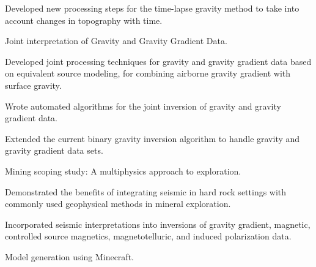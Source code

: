 \begin{cventries}
{\begin{cvitems}
        \item {Developed new processing steps for the time-lapse gravity method to take into account changes in topography with time.}
        \vspace{10pt}
      \end{cvitems}
      \begin{cvparagraph}
      \vspace{7pt}
      Joint interpretation of Gravity and Gravity Gradient Data.
      \vspace{7pt}
      \end{cvparagraph}
      \begin{cvitems}
        \item {Developed joint processing techniques for gravity and gravity gradient data based on equivalent source modeling, for combining airborne gravity gradient with surface gravity.}
        \item {Wrote automated algorithms for the joint inversion of gravity and gravity gradient data.}
        \item {Extended the current binary gravity inversion algorithm to handle gravity and gravity gradient data sets.}
        \vspace{10pt}
      \end{cvitems}
      \begin{cvparagraph}
      \vspace{7pt}
      Mining scoping study: A multiphysics approach to exploration.
      \vspace{7pt}
      \end{cvparagraph}
      \begin{cvitems}
        \item {Demonstrated the benefits of integrating seismic in hard rock settings with commonly used geophysical methods in mineral exploration.}
        \item {Incorporated seismic interpretations into inversions of gravity gradient, magnetic, controlled source magnetics, magnetotelluric, and induced polarization data.}
        \vspace{10pt}
      \end{cvitems}
    }
    \cventry
    {} %
    {} %
    {} %
    {} %
    {
      \begin{cvparagraph}
      \vspace{7pt}
      Model generation using Minecraft.
      \vspace{7pt}
      \end{cvparagraph}
}
\end{cventries}

